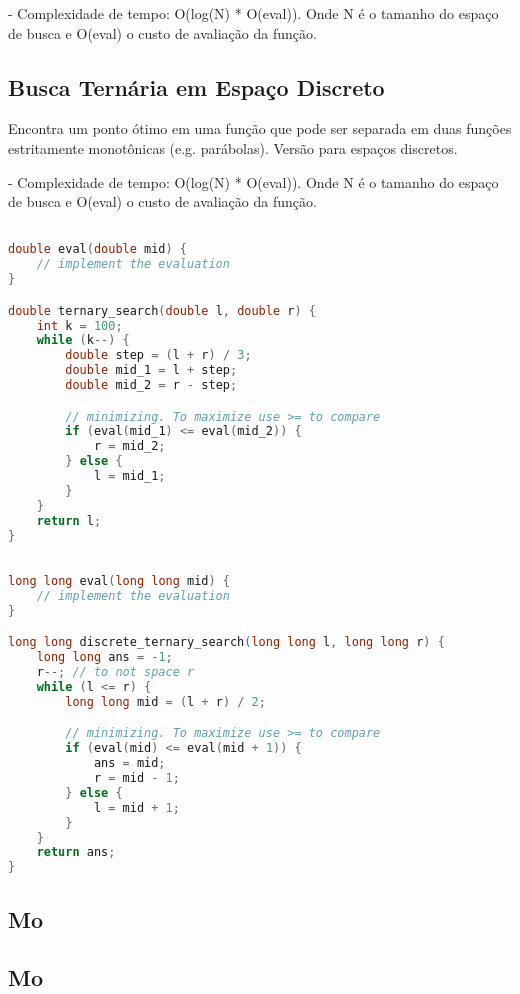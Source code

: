 \documentclass[11pt, a4paper, twoside]{article}
\begin{document}
- Complexidade de tempo: O(log(N) * O(eval)). Onde N é o tamanho do espaço de busca e O(eval) o custo de avaliação da função.

\subsection{Busca Ternária em Espaço Discreto}


Encontra um ponto ótimo em uma função que pode ser separada em duas funções estritamente monotônicas (e.g. parábolas).
Versão para espaços discretos.

- Complexidade de tempo: O(log(N) * O(eval)). Onde N é o tamanho do espaço de busca e O(eval) o custo de avaliação da função.
\begin{multicols}{2}
\begin{lstlisting}[language=C++]

double eval(double mid) {
    // implement the evaluation
}

double ternary_search(double l, double r) {
    int k = 100;
    while (k--) {
        double step = (l + r) / 3;
        double mid_1 = l + step;
        double mid_2 = r - step;

        // minimizing. To maximize use >= to compare
        if (eval(mid_1) <= eval(mid_2)) {
            r = mid_2;
        } else {
            l = mid_1;
        }
    }
    return l;
}
\end{lstlisting}
\end{multicols}

\begin{lstlisting}[language=C++]

long long eval(long long mid) {
    // implement the evaluation
}

long long discrete_ternary_search(long long l, long long r) {
    long long ans = -1;
    r--; // to not space r
    while (l <= r) {
        long long mid = (l + r) / 2;

        // minimizing. To maximize use >= to compare
        if (eval(mid) <= eval(mid + 1)) {
            ans = mid;
            r = mid - 1;
        } else {
            l = mid + 1;
        }
    }
    return ans;
}
\end{lstlisting}

\subsection{Mo}

\subsection{Mo}
\end{document}
